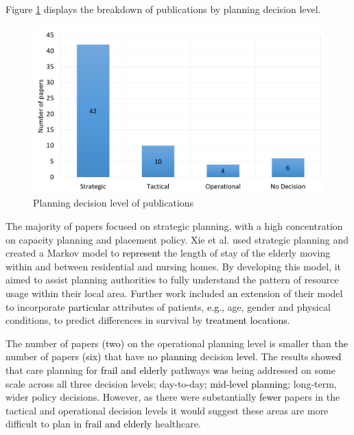 \documentclass[../thesis.tex]{subfiles}
\begin{document}
Figure \ref{fig:PlanningDecision} displays the breakdown of publications by planning decision level.

\begin{figure}[H]
\centering
    \includegraphics[scale = 0.3]{Chapter2/Figures/Planning1.pdf}
   \caption{Planning decision level of publications} \label{fig:PlanningDecision}
\end{figure}

The majority of papers focused on strategic planning, with a high concentration on capacity planning and placement policy. Xie et al. \cite{Xie} used strategic planning and created a Markov model to \textcolor{black}{represent} the length of stay of the elderly moving within and between residential and nursing homes. By developing this model, it aimed to assist planning authorities to fully understand the pattern of resource usage within their local area. Further work included \textcolor{black}{an} extension of their model to incorporate \textcolor{black}{particular} attributes of patients, \textcolor{black}{e.g.,} age, gender and physical conditions, to predict difference\textcolor{black}{s} in survival by \textcolor{black}{treatment locations}.

The number of papers \textcolor{black}{(two)} on the operational planning level is smaller than \textcolor{black}{the} number of papers \textcolor{black}{(six)} that have no \textcolor{black}{planning} decision \textcolor{black}{level}. The results show\textcolor{black}{ed} that care planning for \textcolor{black}{frail and elderly} pathways \textcolor{black}{was} being addressed on some scale across all three decision levels\textcolor{black}{;} day\textcolor{black}{-}to\textcolor{black}{-}day\textcolor{black}{; mid-level planning;} long-term, wider policy decisions. However, as there were substantially \textcolor{black}{fewer} papers in the tactical and operational decision levels it would suggest these areas are more difficult to plan in \textcolor{black}{frail and elderly} healthcare.
\end{document}

